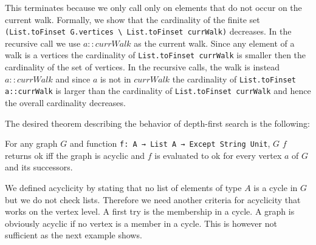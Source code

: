 This terminates because we only call \dfsstep only on elements that do not occur on the current walk. Formally, we show that the cardinality of the finite set \lstinline|(List.toFinset G.vertices \ List.toFinset currWalk)| decreases. In the recursive call we use $a::currWalk$ as the current walk. Since any element of a walk is a vertices the cardinality of \lstinline|List.toFinset currWalk| is smaller then the cardinality of the set of vertices. In the recursive calls, the walk is instead $a::currWalk$ and since $a$ is not in $currWalk$ the cardinality of \lstinline|List.toFinset a::currWalk| is larger than the cardinality of \lstinline|List.toFinset currWalk| and hence the overall cardinality decreases.

The desired theorem describing the behavior of depth-first search is the following:

\begin{theorem}[\dfssemantics]\label{trm:dfssemantics}
    For any graph $G$ and function \lstinline|f: A → List A → Except String Unit|, \dfs $G$ $f$ returns ok iff the graph is acyclic and $f$ is evaluated to ok for every vertex $a$ of $G$ and its successors.
\end{theorem}

We defined acyclicity by stating that no list of elements of type $A$ is a cycle in $G$ but we do not check lists. Therefore we need another criteria for acyclicity that works on the vertex level. A first try is the membership in a cycle. A graph is obviously acyclic if no vertex is a member in a cycle. This is however not sufficient as the next example shows.


